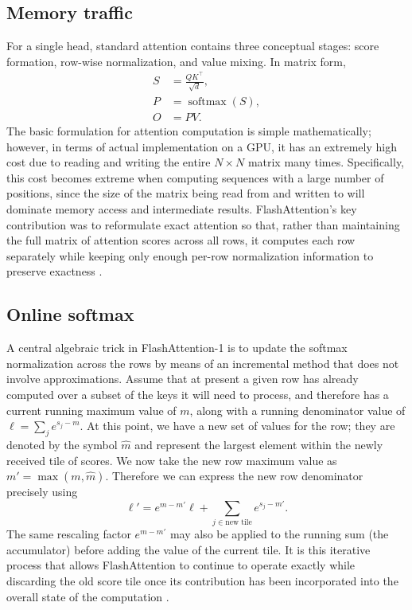 \documentclass{article}
\begin{document}
\subsection{Memory traffic}
For a single head, standard attention contains three conceptual stages: score formation, row-wise normalization, and value mixing. In matrix form,
\begin{align}
S &= \frac{QK^\top}{\sqrt{d}}, \\
P &= \operatorname{softmax}(S), \\
O &= PV.
\end{align}
The basic formulation for attention computation is simple mathematically; however, in terms of actual implementation on a GPU, it has an extremely high cost due to reading and writing the entire $N\times N$ matrix many times. Specifically, this cost becomes extreme when computing sequences with a large number of positions, since the size of the matrix being read from and written to will dominate memory access and intermediate results. FlashAttention's key contribution was to reformulate exact attention so that, rather than maintaining the full matrix of attention scores across all rows, it computes each row separately while keeping only enough per-row normalization information to preserve exactness \citep{dao2022flashattention}.

\subsection{Online softmax}
A central algebraic trick in FlashAttention-1 is to update the softmax normalization across the rows by means of an incremental method that does not involve approximations. Assume that at present a given row has already computed over a subset of the keys it will need to process, and therefore has a current running maximum value of $m$, along with a running denominator value of $\ell = \sum_{j} e^{s_j-m}$. At this point, we have a new set of values for the row; they are denoted by the symbol $\hat{m}$ and represent the largest element within the newly received tile of scores. We now take the new row maximum value as $m'=\max(m,\hat{m})$. Therefore we can express the new row denominator precisely using
\begin{equation}
\ell' = e^{m - m'} \ell + \sum_{j \in \text{new tile}} e^{s_j - m'}.
\end{equation}
The same rescaling factor $e^{m - m'}$ may also be applied to the running sum (the accumulator) before adding the value of the current tile. It is this iterative process that allows FlashAttention to continue to operate exactly while discarding the old score tile once its contribution has been incorporated into the overall state of the computation \citep{dao2022flashattention}.
\end{document}
